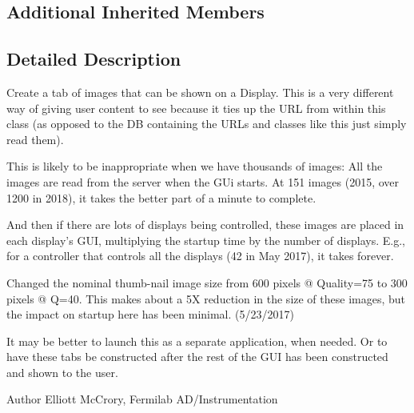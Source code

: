 \subsection*{Additional Inherited Members}


\subsection{Detailed Description}
Create a tab of images that can be shown on a Display. This is a very different way of giving user content to see because it ties up the U\-R\-L from within this class (as opposed to the D\-B containing the U\-R\-Ls and classes like this just simply read them).

This is likely to be inappropriate when we have thousands of images\-: All the images are read from the server when the G\-Ui starts. At 151 images (2015, over 1200 in 2018), it takes the better part of a minute to complete.

And then if there are lots of displays being controlled, these images are placed in each display's G\-U\-I, multiplying the startup time by the number of displays. E.\-g., for a controller that controls all the displays (42 in May 2017), it takes forever.

Changed the nominal thumb-\/nail image size from 600 pixels @ Quality=75 to 300 pixels @ Q=40. This makes about a 5\-X reduction in the size of these images, but the impact on startup here has been minimal. (5/23/2017)

It may be better to launch this as a separate application, when needed. Or to have these tabs be constructed after the rest of the G\-U\-I has been constructed and shown to the user.

\begin{DoxyAuthor}{Author}
Elliott Mc\-Crory, Fermilab A\-D/\-Instrumentation 
\end{DoxyAuthor}


